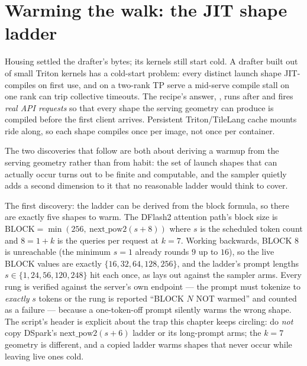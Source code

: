 \section{Warming the walk: the JIT shape ladder}
\label{sec:dflash2-warmup}

Housing settled the drafter's bytes; its kernels still start cold. A
drafter built out of small Triton kernels has a cold-start problem: every
distinct launch shape JIT-compiles on first use, and on a two-rank TP serve
a mid-serve compile stall on one rank can trip collective timeouts. The
recipe's answer, , runs after
 and fires \emph{real API requests} so that every shape the
serving geometry can produce is compiled before the first client arrives.
Persistent Triton/TileLang cache mounts ride along, so each shape compiles
once per image, not once per container.

The two discoveries that follow are both about deriving a warmup from the
serving geometry rather than from habit: the set of launch shapes that can
actually occur turns out to be finite and computable, and the sampler quietly
adds a second dimension to it that no reasonable ladder would think to cover.

The first discovery: the ladder can be derived from the block formula, so
there are exactly five shapes to warm. The DFlash2 attention path's block
size is
$\mathrm{BLOCK} = \min(256,\ \mathrm{next\_pow2}(s + 8))$
where $s$ is the scheduled token count and $8 = 1 + k$ is the queries per
request at $k{=}7$. Working backwards, BLOCK 8 is unreachable (the minimum
$s{=}1$ already rounds $9$ up to $16$), so the live BLOCK values are exactly
$\{16, 32, 64, 128, 256\}$, and the ladder's prompt lengths
$s \in \{1, 24, 56, 120, 248\}$ hit each once, as
 lays out against the sampler arms. Every
rung is verified
against the server's own  endpoint --- the prompt must
tokenize to \emph{exactly} $s$ tokens or the rung is reported
``BLOCK $N$ NOT warmed'' and counted as a failure --- because a
one-token-off prompt silently warms the wrong shape. The script's header is
explicit about the trap this chapter keeps circling: do \emph{not} copy
DSpark's $\mathrm{next\_pow2}(s+6)$ ladder or its long-prompt arms; the
$k{=}7$ geometry is different, and a copied ladder warms shapes that never
occur while leaving live ones cold.

